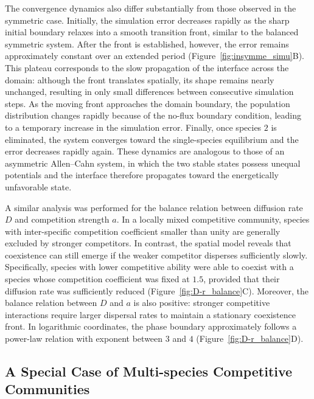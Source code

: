 \vspace{1 cm}

The convergence dynamics also differ substantially from those observed in the symmetric case. Initially, the simulation error decreases rapidly as the sharp initial boundary relaxes into a smooth transition front, similar to the balanced symmetric system. After the front is established, however, the error remains approximately constant over an extended period (Figure~\ref{fig:insymme_simu}B). This plateau corresponds to the slow propagation of the interface across the domain: although the front translates spatially, its shape remains nearly unchanged, resulting in only small differences between consecutive simulation steps. As the moving front approaches the domain boundary, the population distribution changes rapidly because of the no-flux boundary condition, leading to a temporary increase in the simulation error. Finally, once species $2$ is eliminated, the system converges toward the single-species equilibrium and the error decreases rapidly again. These dynamics are analogous to those of an asymmetric Allen--Cahn system, in which the two stable states possess unequal potentials and the interface therefore propagates toward the energetically unfavorable state. 

A similar analysis was performed for the balance relation between diffusion rate $D$ and competition strength $a$. In a locally mixed competitive community, species with inter-specific competition coefficient smaller than unity are generally excluded by stronger competitors. In contrast, the spatial model reveals that coexistence can still emerge if the weaker competitor disperses sufficiently slowly. Specifically, species with lower competitive ability were able to coexist with a species whose competition coefficient was fixed at $1.5$, provided that their diffusion rate was sufficiently reduced (Figure~\ref{fig:D-r_balance}C). Moreover, the balance relation between $D$ and $a$ is also positive: stronger competitive interactions require larger dispersal rates to maintain a stationary coexistence front. In logarithmic coordinates, the phase boundary approximately follows a power-law relation with exponent between $3$ and $4$ (Figure~\ref{fig:D-r_balance}D).

\subsection{A Special Case of Multi-species Competitive Communities}

